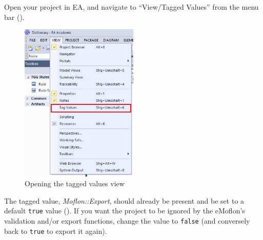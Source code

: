 \begin{stepbystep}

\item Open your project in EA, and navigate to ``View/Tagged Values'' from the menu bar ().

\begin{figure}[htbp]
\begin{center}  \includegraphics[width=0.5\textwidth]{../../org.moflon.doc.handbook.05_miscellaneous/1_grokkingEA/04_exclusion/ea_viewTaggedValues}
  \caption{Opening the tagged values view}  
  \label{ea:view/Taggedvalues}
\end{center}
\end{figure} 

\item The tagged value, \emph{Moflon::Export}, should already be present and be set to a default \texttt{true} value
(). If you want the project to be ignored by the eMoflon's validation and/or export functions, change the value to
\texttt{false} (and conversely back to \texttt{true} to export it again).


\end{stepbystep}
